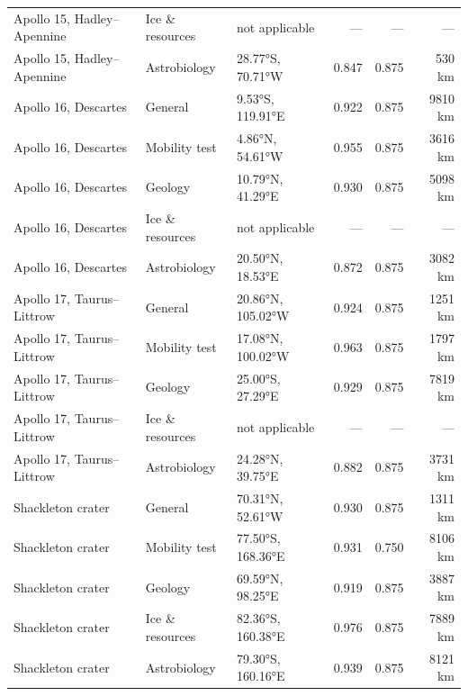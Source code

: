 \begin{table}[ht]
\begin{tabular}{lllrrr}
Apollo 15, Hadley–Apennine & Ice \& resources & not applicable & — & — & — \\
Apollo 15, Hadley–Apennine & Astrobiology & 28.77°S, 70.71°W & 0.847 & 0.875 & 530 km \\
Apollo 16, Descartes & General & 9.53°S, 119.91°E & 0.922 & 0.875 & 9810 km \\
Apollo 16, Descartes & Mobility test & 4.86°N, 54.61°W & 0.955 & 0.875 & 3616 km \\
Apollo 16, Descartes & Geology & 10.79°N, 41.29°E & 0.930 & 0.875 & 5098 km \\
Apollo 16, Descartes & Ice \& resources & not applicable & — & — & — \\
Apollo 16, Descartes & Astrobiology & 20.50°N, 18.53°E & 0.872 & 0.875 & 3082 km \\
Apollo 17, Taurus–Littrow & General & 20.86°N, 105.02°W & 0.924 & 0.875 & 1251 km \\
Apollo 17, Taurus–Littrow & Mobility test & 17.08°N, 100.02°W & 0.963 & 0.875 & 1797 km \\
Apollo 17, Taurus–Littrow & Geology & 25.00°S, 27.29°E & 0.929 & 0.875 & 7819 km \\
Apollo 17, Taurus–Littrow & Ice \& resources & not applicable & — & — & — \\
Apollo 17, Taurus–Littrow & Astrobiology & 24.28°N, 39.75°E & 0.882 & 0.875 & 3731 km \\
Shackleton crater & General & 70.31°N, 52.61°W & 0.930 & 0.875 & 1311 km \\
Shackleton crater & Mobility test & 77.50°S, 168.36°E & 0.931 & 0.750 & 8106 km \\
Shackleton crater & Geology & 69.59°N, 98.25°E & 0.919 & 0.875 & 3887 km \\
Shackleton crater & Ice \& resources & 82.36°S, 160.38°E & 0.976 & 0.875 & 7889 km \\
Shackleton crater & Astrobiology & 79.30°S, 160.16°E & 0.939 & 0.875 & 8121 km \\
\hline
\end{tabular}
\end{table}